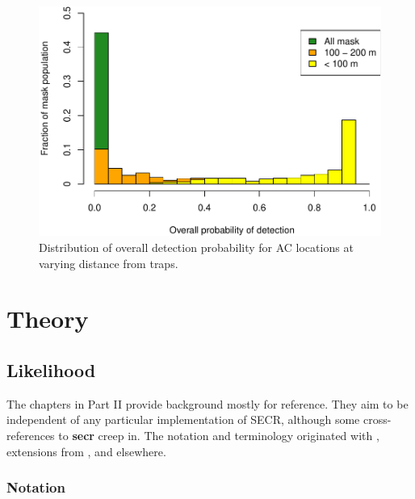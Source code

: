 \documentclass[
]{book}
\begin{document}
\begin{figure}
\includegraphics[width=0.65\linewidth,height=0.6\textheight]{SECRbook_files/figure-latex/pdotdist-1} \caption{Distribution of overall detection probability for AC locations at varying distance from traps.}\label{fig:pdotdist}
\end{figure}

\part*{Theory}\label{part-theory}

\chapter{Likelihood}\label{Theory}

\renewcommand{\vec}[1]{\mathbf{#1}}

The chapters in Part II provide background mostly for reference. They aim to be independent of any particular implementation of SECR, although some cross-references to \textbf{secr} creep in. The notation and terminology originated with \citet{be08}, extensions from \citet{ebb09}, \citet{e11} and elsewhere.

\section{Notation}\label{notation}

\end{document}
